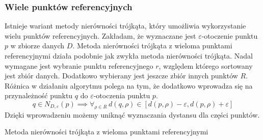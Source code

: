 \subsubsection{Wiele punktów referencyjnych}
Istnieje wariant metody nierówności trójkąta, który umożliwia wykorzystanie wielu punktów referencyjnych. Zakładam, że wyznaczane jest \linebreak$ \varepsilon $-otoczenie punktu $ p $ w zbiorze danych $ D $. Metoda nierówności trójkąta z wieloma punktami referencyjnymi działa podobnie jak zwykła metoda nierówności trójkąta. Nadal wymagane jest wybranie punktu referencyjnego $ r $, względem którego sortowany jest zbiór danych. Dodatkowo wybierany jest jeszcze zbiór innych punktów $ R $. Różnica w działaniu algorytmu polega na tym, że dodatkowo wprowadza się  na przynależność punktu $ q $ do $ \varepsilon $-otoczenia punktu $ p $.
\begin{equation}\label{eq:ti-reference-mult}
q \in N_{D,\varepsilon}(p) \implies  \forall_{\rho\in R}\,d(q,\rho) \in \left[d(p,\rho)-\varepsilon,d(p,\rho)+\varepsilon\right] 
\end{equation}
Dzięki wprowadzeniu  możemy uniknąć wyznaczania dystansu dla części punktów.

\begin{algorithm}[t]
	\caption{Metoda nierówności trójkąta z wieloma punktami referencyjnymi}\label{alg:ti-mult}
	
	\DontPrintSemicolon
	
	
	\setcounter{AlgoLine}{0}
	\nonl{}
	\setcounter{AlgoLine}{0}
	\nonl{}
	
	\setcounter{AlgoLine}{0}
	\nonl{}
	\nonl{}
\end{algorithm} 
